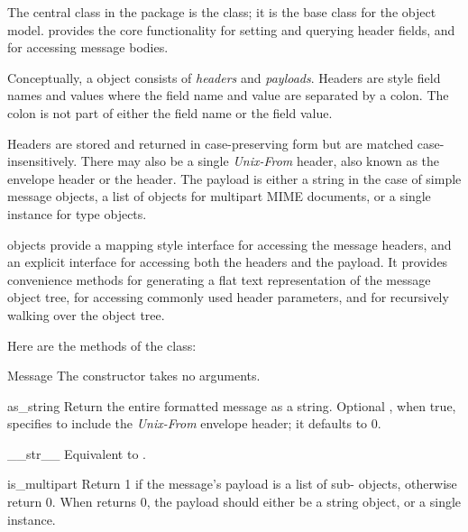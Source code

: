 
The central class in the  package is the
 class; it is the base class for the 
object model.   provides the core functionality for
setting and querying header fields, and for accessing message bodies.

Conceptually, a  object consists of \emph{headers} and
\emph{payloads}.  Headers are  style field names and
values where the field name and value are separated by a colon.  The
colon is not part of either the field name or the field value.

Headers are stored and returned in case-preserving form but are
matched case-insensitively.  There may also be a single
\emph{Unix-From} header, also known as the envelope header or the
 header.  The payload is either a string in the case of
simple message objects, a list of  objects for
multipart MIME documents, or a single  instance for
 type objects.

 objects provide a mapping style interface for
accessing the message headers, and an explicit interface for accessing
both the headers and the payload.  It provides convenience methods for
generating a flat text representation of the message object tree, for
accessing commonly used header parameters, and for recursively walking
over the object tree.

Here are the methods of the  class:

\begin{classdesc}{Message}{}
The constructor takes no arguments.
\end{classdesc}

\begin{methoddesc}[Message]{as_string}{}
Return the entire formatted message as a string.  Optional
, when true, specifies to include the \emph{Unix-From}
envelope header; it defaults to 0.
\end{methoddesc}

\begin{methoddesc}[Message]{__str__}{}
Equivalent to .
\end{methoddesc}

\begin{methoddesc}[Message]{is_multipart}{}
Return 1 if the message's payload is a list of sub-
objects, otherwise return 0.  When  returns 0,
the payload should either be a string object, or a single
 instance.
\end{methoddesc}

